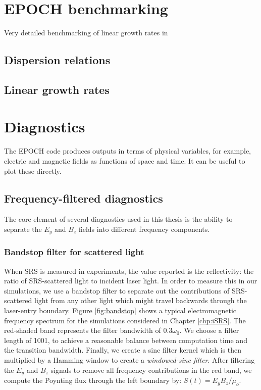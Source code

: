\section{EPOCH benchmarking}

Very detailed benchmarking of linear growth rates in \citet{Seaton2019}

\subsection{Dispersion relations}
\subsection{Linear growth rates}



\section{Diagnostics}



The EPOCH code produces outputs in terms of physical variables, for example, electric and magnetic fields as functions of space and time. It can be useful to plot these directly.

\subsection{Frequency-filtered diagnostics}
The core element of several diagnostics used in this thesis is the ability to separate the $E_y$ and $B_z$ fields into different frequency components. 

\subsubsection{Bandstop filter for scattered light} When SRS is measured in experiments, the value reported is the reflectivity: the ratio of SRS-scattered light to incident laser light. In order to measure this in our simulations, we use a bandstop filter to separate out the contributions of SRS-scattered light from any other light which might travel backwards through the laser-entry boundary. Figure \ref{fig:bandstop} shows a typical electromagnetic frequency spectrum for the simulations considered in Chapter \ref{chp:iSRS}. The red-shaded band represents the filter bandwidth of $0.3\omega_0$. We choose a filter length of 1001, to achieve a reasonable balance between computation time and the transition bandwidth. Finally, we create a sinc filter kernel which is then multiplied by a Hamming window to create a \textit{windowed-sinc filter}. After filtering the $E_y$ and $B_z$ signals to remove all frequency contributions in the red band, we compute the Poynting flux through the left boundary by: $S(t)=E_yB_z/\mu_o$.


